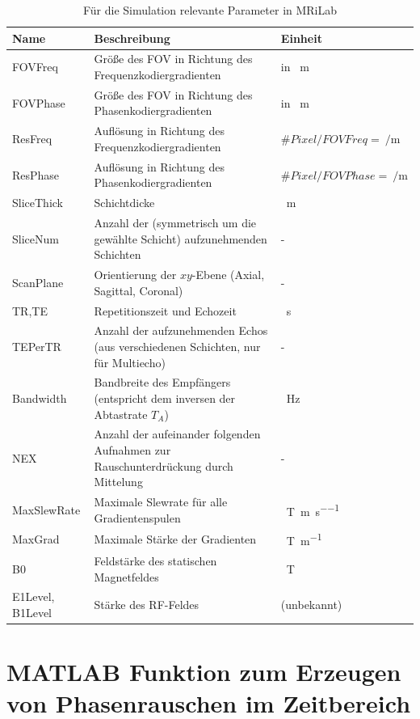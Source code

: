 \begin{table}[H]
	\caption{Für die Simulation relevante Parameter in MRiLab}
	\centering
	\begin{tabularx}{\textwidth}{l X l}
		\toprule
		\textbf{Name} & \textbf{Beschreibung} & \textbf{Einheit} \\
		\midrule
		FOVFreq & Größe des FOV in Richtung des Frequenzkodiergradienten & in \SI{}{\m}\\
		FOVPhase & Größe des FOV in Richtung des Phasenkodiergradienten & in \SI{}{\m}\\
		ResFreq & Auflösung in Richtung des Frequenzkodiergradienten & $\#Pixel/FOVFreq=\SI{}{\per\m}$\\
		ResPhase & Auflösung in Richtung des Phasenkodiergradienten & $\#Pixel/FOVPhase=\SI{}{\per\m}$\\
		SliceThick & Schichtdicke & \SI{}{\m}\\
		SliceNum & Anzahl der (symmetrisch um die gewählte Schicht) aufzunehmenden Schichten & - \\
		ScanPlane & Orientierung der $xy$-Ebene (Axial, Sagittal, Coronal) & - \\
		TR,TE & Repetitionszeit und Echozeit & \SI{}{\s}\\
		TEPerTR & Anzahl der aufzunehmenden Echos (aus verschiedenen Schichten, nur für Multiecho) & - \\
		Bandwidth & Bandbreite des Empfängers (entspricht dem inversen der Abtastrate $T_A$) & \SI{}{\hertz}\\
		NEX & Anzahl der aufeinander folgenden Aufnahmen zur Rauschunterdrückung durch Mittelung & - \\
		MaxSlewRate & Maximale Slewrate für alle Gradientenspulen & \SI{}{\tesla\per\m\per\s}\\
		MaxGrad & Maximale Stärke der Gradienten & \SI{}{\tesla\per\m}\\
		B0 & Feldstärke des statischen Magnetfeldes & \SI{}{\tesla}\\
		E1Level, B1Level & Stärke des RF-Feldes & (unbekannt)\\
		\bottomrule
	\end{tabularx}
	\label{tab:mriLabParam}
\end{table}

\section{MATLAB Funktion zum Erzeugen von Phasenrauschen im Zeitbereich}
\label{sec:addPhaseNoise}


